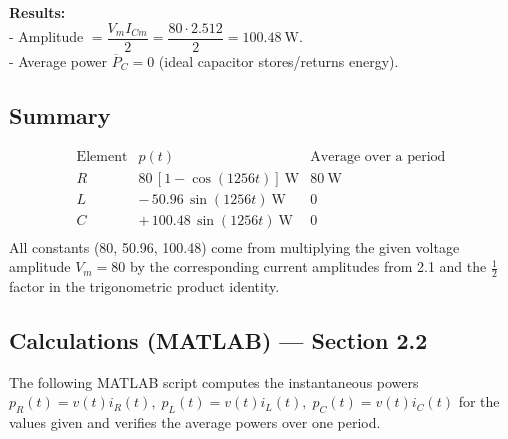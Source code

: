 \documentclass{article}
\begin{document}
\noindent\textbf{Results:}
\\
- Amplitude \(= \dfrac{V_m I_{Cm}}{2}=\dfrac{80\cdot2.512}{2}=100.48\ \text{W}\).
\\
- Average power \(\overline P_C=0\) (ideal capacitor stores/returns energy).

\vspace{0.8em}
\subsection*{Summary}
\[
\begin{array}{c|c|c}
\text{Element} & p(t) & \text{Average over a period} \\\hline
R & 80\,[1-\cos(1256t)]\ \text{W} & 80~\text{W} \\
L & -\,50.96\,\sin(1256t)\ \text{W} & 0 \\
C & +\,100.48\,\sin(1256t)\ \text{W} & 0 \\
\end{array}
\]
All constants (80, 50.96, 100.48) come from multiplying the given voltage amplitude 
$V_m=80$ by the corresponding current amplitudes from 2.1 and the 
$\tfrac12$ factor in the trigonometric product identity.

\vspace{0.5cm}

\subsection*{Calculations (MATLAB) --- Section 2.2}

The following MATLAB script computes the instantaneous powers
\(
p_R(t)=v(t)i_R(t),\;
p_L(t)=v(t)i_L(t),\;
p_C(t)=v(t)i_C(t)
\)
for the values given and verifies the average powers over one period.
\end{document}
